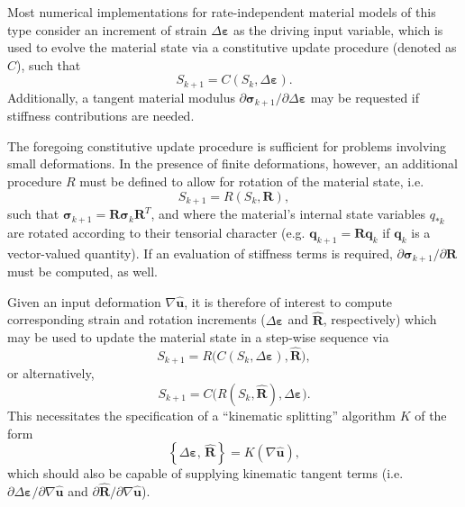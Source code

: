 Most numerical implementations for rate-independent material models of this type consider an increment of strain $\Delta \boldsymbol{\varepsilon}$ as the driving input variable, which is used to evolve the material state via a constitutive update procedure (denoted as $C$), such that
\begin{equation}
    S_{k+1} = C (S_{k}, \Delta \boldsymbol{\varepsilon}).
\end{equation}
Additionally, a tangent material modulus $\partial \boldsymbol{\sigma}_{k+1} / \partial \Delta \boldsymbol{\varepsilon}$ may be requested if stiffness contributions are needed.

The foregoing constitutive update procedure is sufficient for problems involving small deformations. In the presence of finite deformations, however, an additional procedure $R$ must be defined to allow for rotation of the material state, i.e.
\begin{equation}
    S_{k+1} = R (S_k, \mathbf{R}),
\end{equation}
such that $\boldsymbol{\sigma}_{k+1} = \mathbf{R} \boldsymbol{\sigma}_{k} \mathbf{R}^T$, and where the material's internal state variables $q_{*k}$ are rotated according to their tensorial character (e.g. $\mathbf{q}_{k+1} = \mathbf{R} \mathbf{q}_k$ if $\mathbf{q}_k$ is a vector-valued quantity). If an evaluation of stiffness terms is required, $\partial \boldsymbol{\sigma}_{k+1} / \partial \mathbf{R}$ must be computed, as well.

Given an input deformation $\nabla \hat{\mathbf{u}}$, it is therefore of interest to compute corresponding strain and rotation increments ($\Delta \boldsymbol{\varepsilon}$ and $\hat{\mathbf{R}}$, respectively) which may be used to update the material state in a step-wise sequence via
\begin{equation}
    S_{k+1} = R\big(C(S_k, \Delta \boldsymbol{\varepsilon}), \hat{\mathbf{R}}\big),
\end{equation}
or alternatively,
\begin{equation}
    S_{k+1} = C\big(R(S_k, \hat{\mathbf{R}}), \Delta \boldsymbol{\varepsilon}\big).
\end{equation}
This necessitates the specification of a ``kinematic splitting'' algorithm $K$ of the form
\begin{equation}
    \left\{ \Delta \boldsymbol{\varepsilon}, \, \hat{\mathbf{R}} \right\} = K(\nabla \hat{\mathbf{u}}),
\end{equation}
which should also be capable of supplying kinematic tangent terms (i.e. $\partial \Delta \boldsymbol{\varepsilon} / \partial \nabla \hat{\mathbf{u}}$ and $\partial \hat{\mathbf{R}} / \partial \nabla \hat{\mathbf{u}}$).


